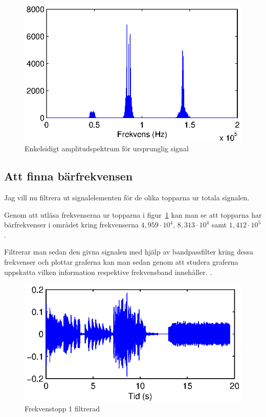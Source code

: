 \documentclass[10pt,twocolumn]{article}
\begin{document}
\begin{figure}[htp]
  \begin{center}
  \includegraphics[keepaspectratio=true,width=\linewidth]{fft_orig_data_oneside.eps}  %
  \end{center}
  \caption{Enkelsidigt amplitudspektrum för ursprunglig signal} %
  \label{fig:fft_orig_data}
\end{figure}

\subsection{Att finna bärfrekvensen}

Jag vill nu filtrera ut signalelementen för de olika topparna ur totala signalen. 

Genom att utläsa frekvenserna ur topparna i figur~\ref{fig:fft_orig_data} kan man se att topparna har bärfrekvenser i området kring frekvenserna $4,959 \cdot 10^4$, $8,313 \cdot 10^4$ samt $1,412 \cdot 10^5$.

Filtrerar man sedan den givna signalen med hjälp av bandpassfilter kring dessa frekvenser och plottar graferna kan man sedan genom att studera graferna uppskatta vilken information respektive frekvensband innehåller. . 

\begin{figure}[htp]
  \begin{center}
  \includegraphics[keepaspectratio=true,width=\linewidth]{topp1.eps}  %
  \end{center}
  \caption{Frekvenstopp 1 filtrerad} %
  \label{fig:topp1_filter}
\end{figure}
\end{document}
